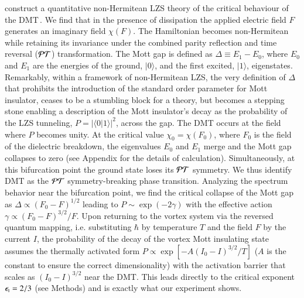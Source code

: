 \documentclass[aps,twocolumn,prl,10pt,amsmath,amssymb,nofootinbib,showpacs,superscriptaddress,floatfix]{revtex4-1}
\newcommand{\rs}{\rm\scriptscriptstyle}
\begin{document}
construct a quantitative non-Hermitean LZS theory of the critical behaviour of the DMT\,\cite{tripathi:2016}.
We find that in the presence of dissipation the applied electric
field $F$ generates an imaginary field $\chi(F)$. The Hamiltonian becomes non-Hermitean while retaining its invariance under 
the combined parity reflection and time reversal (${\cal PT}$) transformation.
The Mott gap is defined as $\Delta\equiv E_1-E_0$, where $E_0$ and $E_1$ are the energies of the ground, $|0\rangle$, and the first excited, $|1\rangle$, eigenstates.
Remarkably, within a framework of non-Hermitean LZS, the very definition of $\Delta$ that prohibits the introduction of the standard order parameter for Mott insulator, ceases to be 
a stumbling block for a theory, but becomes a stepping stone enabling a description of the Mott insulator's decay as the probability of the LZS tunneling, $P=|\langle 0|1\rangle|^2$, across the gap. The DMT occurs at the field where $P$ becomes unity.
At the critical value $\chi_0=\chi(F_0)$, where $F_0$ is the field of the dielectric breakdown,
the eigenvalues $E_0$ and $E_1$ merge and the Mott gap collapses to zero (see Appendix for the details of calculation).
Simultaneously, at this bifurcation point the ground state loses its  ${\cal PT}$ symmetry.
We thus identify DMT as the ${\cal PT}$ symmetry-breaking phase transition.
Analyzing the spectrum behavior near the bifurcation point, we find the critical collapse of the Mott gap as
$\Delta\propto (F_0-F)^{1/2}$ leading to $P\sim\exp(-2\gamma)$ with the effective action $\gamma\propto(F_0-F)^{3/2}/F$.
Upon returning to the vortex system via the reversed quantum mapping, i.e. substituting $\hbar$ by temperature $T$ and the field $F$ by the current $I$, the probability of the decay of the vortex Mott insulating state assumes the thermally activated form 
$P\propto\exp[-A(I_0-I)^{3/2}/T]$ ($A$ is the constant to ensure the correct dimensionality) 
with the activation barrier that scales as $(I_0-I)^{3/2}$ near the DMT.
This leads directly to the critical exponent $\epsilon_{\rs I}=2/3$ (see Methods) and is exactly what our experiment shows.
\end{document}
